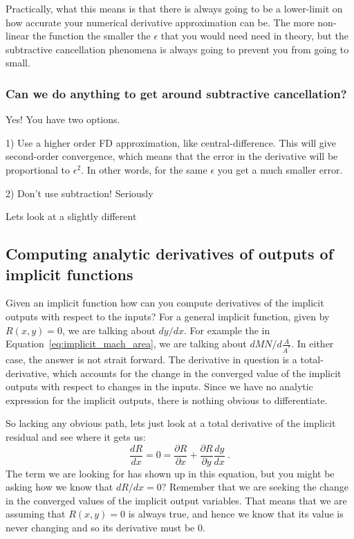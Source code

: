 \documentclass[conf]{new-aiaa}
\begin{document}
    Practically, what this means is that there is always going to be a lower-limit on how accurate your numerical derivative approximation can be. 
    The more non-linear the function the smaller the $\epsilon$ that you would need need in theory, but the subtractive cancellation phenomena is always going to prevent you from going to small. 

    \subsubsection*{Can we do anything to get around subtractive cancellation?}

    Yes! You have two options. 

    1) Use a higher order FD approximation, like central-difference. 
    This will give second-order convergence, which means that the error in the derivative will be proportional to $\epsilon^2$. 
    In other words, for the same $\epsilon$ you get a much smaller error. 

    2) Don't use subtraction! Seriously

    Lets look at a slightly different 



    \subsection{Computing analytic derivatives of outputs of implicit functions}

    Given an implicit function how can you compute derivatives of the implicit outputs with respect to the inputs? 
    For a general implicit function, given by $R(x,y)=0$, we are talking about $dy/dx$. 
    For example the in Equation~\eqref{eq:implicit_mach_area}, we are talking about $dMN/d\frac{A}{A^*}$. 
    In either case, the answer is not strait forward. 
    The derivative in question is a total-derivative, which accounts for the change in the converged value of the implicit outputs with respect to changes in the inputs. 
    Since we have no analytic expression for the implicit outputs, there is nothing obvious to differentiate. 

    So lacking any obvious path, lets just look at a total derivative of the implicit residual and see where it gets us: 
    \begin{equation}
        \frac{d R}{dx} = 0 = \frac{\partial R}{\partial x} + \frac{\partial R}{\partial y}\frac{dy}{dx}  \ . \label{eq:residual_total_deriv}
    \end{equation}
    The term we are looking for has shown up in this equation, but you might be asking how we know that $dR/dx=0$? 
    Remember that we are seeking the change in the converged values of the implicit output variables. 
    That means that we are assuming that $R(x,y)=0$ is always true, and hence we know that its value is never changing and so its derivative must be 0. 
\end{document}
